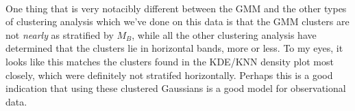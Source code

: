 \documentclass[11pt]{article}
\begin{document}
    \begin{center}
    \end{center}
    { \hspace*{\fill} \\}
    
    One thing that is very notacibly different between the GMM and the other
types of clustering analysis which we've done on this data is that the
GMM clusters are not \emph{nearly} as stratified by \(M_B\), while all
the other clustering analysis have determined that the clusters lie in
horizontal bands, more or less. To my eyes, it looks like this matches
the clusters found in the KDE/KNN density plot most closely, which were
definitely not stratifed horizontally. Perhaps this is a good indication
that using these clustered Gaussians is a good model for observational
data.


    
    
    
    
\end{document}
